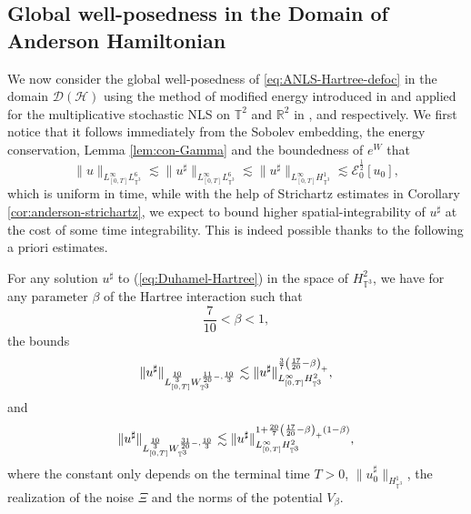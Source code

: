 \subsection{Global well-posedness in the Domain of Anderson
Hamiltonian}\label{sec:high-order-energy}

We now consider the global well-posedness of \eqref{eq:ANLS-Hartree-defoc} in
the domain $\mathcal{D} (\mathcal{H})$ using the method of modified
energy introduced in {\cite{PTV17}} and applied for the multiplicative
stochastic NLS on $\mathbb{T}^2$ and $\mathbb{R}^2$ in {\cite{TV23b}},
{\cite{TZ23a}} and {\cite{DLTV24}} respectively. We first notice that it
follows immediately from the Sobolev embedding, the energy conservation, Lemma
\ref{lem:con-Gamma} and the boundedness of $e^W$ that
\begin{equation}
  \| u \|_{L_{[0, T]}^{\infty} L_{\mathbb{T}^3}^6} \lesssim \| u^{\sharp}
  \|_{L_{[0, T]}^{\infty} L_{\mathbb{T}^3}^6} \lesssim \| u^{\sharp}
  \|_{L_{[0, T]}^{\infty} H_{\mathbb{T}^3}^1} \lesssim
  \mathcal{E}^{\frac{1}{2}}_0 [u_0], \label{Lp-from-energy}
\end{equation}
which is uniform in time, while with the help of Strichartz estimates in
Corollary \ref{cor:anderson-strichartz}, we expect to bound higher
spatial-integrability of $u^{\sharp}$ at the cost of some time
integrability. This is indeed possible thanks to the following a
priori estimates.

\begin{lem}
  \label{lem:nonlinear-strichartz}For any solution $u^{\sharp}$ to
  (\ref{eq:Duhamel-Hartree}) in the space of $H_{\mathbb{T}^3}^2$, we have for
  any parameter $\beta$ of the Hartree interaction such that
  \[ \frac{7}{10} < \beta < 1, \]
  the bounds
  \begin{equation}
    \| u^{\sharp} \|_{L^{\frac{10}{3}}_{[0, T]}
    W_{\mathbb{T}^3}^{\frac{11}{20} -, \frac{10}{3}}} \lesssim \| u^{\sharp}
    \|^{{\color[HTML]{000000}\frac{3}{7}} \left(
    {\color[HTML]{000000}\frac{17}{20} - \beta} \right)_+}_{L_{[0,
    T]}^{\infty} H_{\mathbb{T}^3}^2}, \label{nonlinear-Strichartz-H1}
  \end{equation}
  and
  \begin{equation}
    \| u^{\sharp} \|_{L^{\frac{10}{3}}_{[0, T]}
    W_{\mathbb{T}^3}^{\frac{31}{20} -, \frac{10}{3}}} \lesssim \| u^{\sharp}
    \|^{1 + {\color[HTML]{000000}\frac{20}{7} \left(
    {\color[HTML]{000000}\frac{17}{20} - \beta} \right)_+ (1 -
    \beta)}}_{L_{[0, T]}^{\infty} H_{\mathbb{T}^3}^2},
    \label{nonlinear-Strichartz-H2}
  \end{equation}
  where the constant only depends on the terminal time $T > 0$, $\|
  u_0^{\sharp} \|_{H_{\mathbb{T}^3}^1}$, the realization of the noise $\Xi$
  and the norms of the potential $V_{\beta}$.
\end{lem}

